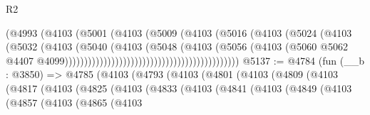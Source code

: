 \begin{lexlean}{R2}
\begin{coremodule}
                                                        (@4993
                                                          (@4103
                                                            (@5001
                                                              (@4103
                                                                (@5009
                                                                  (@4103
                                                                    (@5016
                                                                      (@4103
                                                                        (@5024
                                                                          (@4103
                                                                            (@5032
                                                                              (@4103
                                                                                (@5040
                                                                                  (@4103
                                                                                    (@5048
                                                                                      (@4103
                                                                                        (@5056
                                                                                          (@4103
                                                                                            (@5060
                                                                                              @5062
                                                                                              @4407
                                                                                              @4099)))))))))))))))))))))))))))))))))))))))))))))
@5137 := @4784
    (fun (__b : @3850) =>
    @4785
      (@4103
        (@4793
          (@4103
            (@4801
              (@4103
                (@4809
                  (@4103
                    (@4817
                      (@4103
                        (@4825
                          (@4103
                            (@4833
                              (@4103
                                (@4841
                                  (@4103
                                    (@4849
                                      (@4103
                                        (@4857
                                          (@4103
                                            (@4865
                                              (@4103

\end{coremodule}
\end{lexlean}
